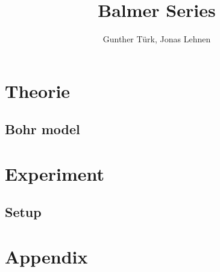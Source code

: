\documentclass[]{article}
\title{Balmer Series}
\author{Gunther T\"urk, Jonas Lehnen}
\begin{document}
\maketitle
\begin{abstract}


\end{abstract}

\tableofcontents


\section{Theorie}
\subsection{Bohr model}


\section{Experiment}

\subsection{Setup}

\section{Appendix}


\newpage
\begin{thebibliography}{}


\end{thebibliography}
\end{document}
